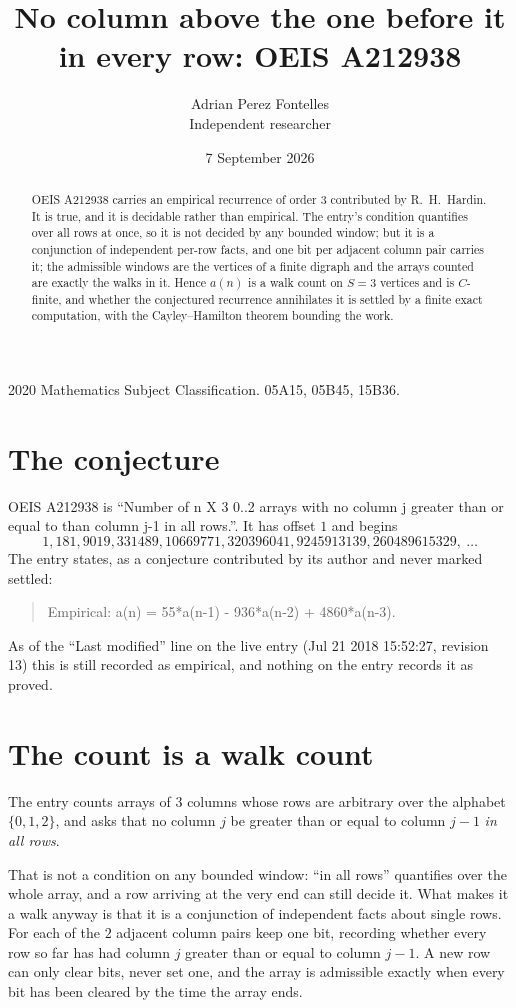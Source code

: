 \documentclass[11pt,a4paper]{article}
\title{No column above the one before it in every row: OEIS A212938}
\author{Adrian Perez Fontelles\\ \small Independent researcher}
\date{7 September 2026}
\theoremstyle{plain}
\theoremstyle{definition}
\begin{document}
\maketitle

\begin{abstract}
OEIS A212938 carries an empirical recurrence of order $3$ contributed by R.~H.~Hardin. It is
true, and it is decidable rather than empirical. The entry's condition quantifies over all rows at once, so it is not decided by any
bounded window; but it is a conjunction of independent per-row facts, and one bit per
adjacent column pair carries it; the
admissible windows are the vertices of a finite digraph and the arrays counted are exactly the
walks in it. Hence $a(n)$ is a walk count on $S=3$ vertices and is $C$-finite, and whether the
conjectured recurrence annihilates it is settled by a finite exact computation, with the
Cayley--Hamilton theorem bounding the work.
\end{abstract}

\noindent\small 2020 Mathematics Subject Classification. 05A15, 05B45, 15B36.\normalsize

\section{The conjecture}

OEIS A212938 is ``Number of n X 3 0..2 arrays with no column j greater than or equal to than column j-1 in all rows.''. It has offset $1$ and begins
\[
1, 181, 9019, 331489, 10669771, 320396041, 9245913139, 260489615329,\ \dots
\]
The entry states, as a conjecture contributed by its author and never marked settled:
\begin{quote}
Empirical: a(n) = 55*a(n-1) - 936*a(n-2) + 4860*a(n-3).
\end{quote}
As of the ``Last modified'' line on the live entry (Jul 21 2018 15:52:27, revision 13) this is still
recorded as empirical, and nothing on the entry records it as proved.

\section{The count is a walk count}

The entry counts arrays of $3$ columns whose rows are arbitrary over the alphabet $\{0,1,2\}$, and asks that no column $j$ be greater than or equal to column $j-1$ \emph{in all rows}.

That is not a condition on any bounded window: ``in all rows'' quantifies over the whole array, and a row arriving at the very end can still decide it. What makes it a walk anyway is that it is a conjunction of independent facts about single rows. For each of the $2$ adjacent column pairs keep one bit, recording whether every row so far has had column $j$ greater than or equal to column $j-1$. A new row can only clear bits, never set one, and the array is admissible exactly when every bit has been cleared by the time the array ends.
\end{document}

